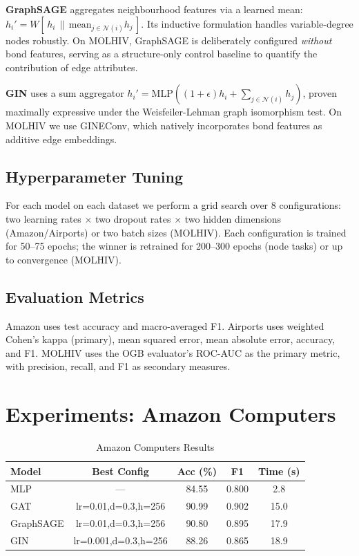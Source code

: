 \documentclass[conference]{IEEEtran}
\begin{document}
\textbf{GraphSAGE} \cite{hamilton2017} aggregates neighbourhood features via a learned mean: $h_i' = W[\,h_i \,\|\, \text{mean}_{j \in \mathcal{N}(i)} h_j\,]$. Its inductive formulation handles variable-degree nodes robustly. On MOLHIV, GraphSAGE is deliberately configured \emph{without} bond features, serving as a structure-only control baseline to quantify the contribution of edge attributes.

\textbf{GIN} \cite{xu2019} uses a sum aggregator $h_i' = \text{MLP}((1+\epsilon)h_i + \sum_{j \in \mathcal{N}(i)} h_j)$, proven maximally expressive under the Weisfeiler-Lehman graph isomorphism test. On MOLHIV we use GINEConv, which natively incorporates bond features as additive edge embeddings.

\subsection{Hyperparameter Tuning}

For each model on each dataset we perform a grid search over 8 configurations: two learning rates $\times$ two dropout rates $\times$ two hidden dimensions (Amazon/Airports) or two batch sizes (MOLHIV). Each configuration is trained for 50--75 epochs; the winner is retrained for 200--300 epochs (node tasks) or up to convergence (MOLHIV).

\subsection{Evaluation Metrics}

Amazon uses test accuracy and macro-averaged F1. Airports uses weighted Cohen's kappa (primary), mean squared error, mean absolute error, accuracy, and F1. MOLHIV uses the OGB evaluator's ROC-AUC as the primary metric, with precision, recall, and F1 as secondary measures.

\section{Experiments: Amazon Computers}

\begin{table}[t]
\caption{Amazon Computers Results}
\label{tab:amazon}
\centering
\begin{tabular}{lcccc}
\toprule
\textbf{Model} & \textbf{Best Config} & \textbf{Acc (\%)} & \textbf{F1} & \textbf{Time (s)} \\
\midrule
MLP     & ---                    & 84.55 & 0.800 & 2.8  \\
GAT     & lr=0.01,d=0.3,h=256    & 90.99 & 0.902 & 15.0 \\
GraphSAGE & lr=0.01,d=0.3,h=256  & 90.80 & 0.895 & 17.9 \\
GIN     & lr=0.001,d=0.3,h=256   & 88.26 & 0.865 & 18.9 \\
\bottomrule
\end{tabular}
\end{table}
\end{document}
